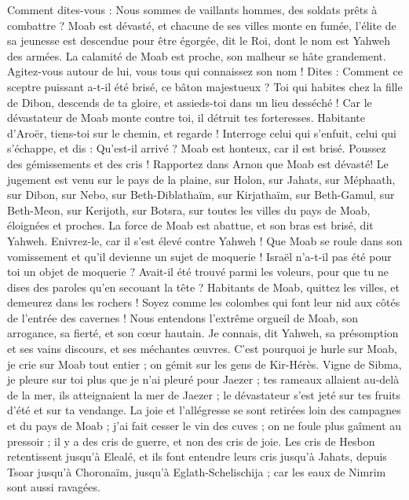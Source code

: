 \begin{multicols}{2}
Comment dites-vous : Nous sommes de vaillants hommes, des soldats prêts à combattre ?
Moab est dévasté, et chacune de ses villes monte en fumée, l'élite de sa jeunesse est descendue pour être égorgée, dit le Roi, dont le nom est Yahweh des armées.
La calamité de Moab est proche, son malheur se hâte grandement.
Agitez-vous autour de lui, vous tous qui connaissez son nom ! Dites : Comment ce sceptre puissant a-t-il été brisé, ce bâton majestueux ?
Toi qui habites chez la fille de Dibon, descends de ta gloire, et assieds-toi dans un lieu desséché ! Car le dévastateur de Moab monte contre toi, il détruit tes forteresses.
Habitante d'Aroër, tiens-toi sur le chemin, et regarde ! Interroge celui qui s'enfuit, celui qui s'échappe, et dis : Qu'est-il arrivé ?
Moab est honteux, car il est brisé. Poussez des gémissements et des cris ! Rapportez dans Arnon que Moab est dévasté!
Le jugement est venu sur le pays de la plaine, sur Holon, sur Jahats, sur Méphaath,
sur Dibon, sur Nebo, sur Beth-Diblathaïm,
sur Kirjathaïm, sur Beth-Gamul, sur Beth-Meon,
sur Kerijoth, sur Botsra, sur toutes les villes du pays de Moab, éloignées et proches.
La force de Moab est abattue, et son bras est brisé, dit Yahweh.
Enivrez-le, car il s'est élevé contre Yahweh ! Que Moab se roule dans son vomissement et qu'il devienne un sujet de moquerie !
Israël n'a-t-il pas été pour toi un objet de moquerie ? Avait-il été trouvé parmi les voleurs, pour que tu ne dises des paroles qu'en secouant la tête ?
Habitants de Moab, quittez les villes, et demeurez dans les rochers ! Soyez comme les colombes qui font leur nid aux côtés de l'entrée des cavernes !
Nous entendons l'extrême orgueil de Moab, son arrogance, sa fierté, et son cœur hautain.
Je connais, dit Yahweh, sa présomption et ses vains discours, et ses méchantes œuvres.
C’est pourquoi je hurle sur Moab, je crie sur Moab tout entier ; on gémit sur les gens de Kir-Hérès.
Vigne de Sibma, je pleure sur toi plus que je n'ai pleuré pour Jaezer ; tes rameaux allaient au-delà de la mer, ils atteignaient la mer de Jaezer ; le dévastateur s'est jeté sur tes fruits d'été et sur ta vendange.
La joie et l'allégresse se sont retirées loin des campagnes et du pays de Moab ; j'ai fait cesser le vin des cuves ; on ne foule plus gaîment au pressoir ; il y a des cris de guerre, et non des cris de joie.
Les cris de Hesbon retentissent jusqu’à Elealé, et ils font entendre leurs cris jusqu’à Jahats, depuis Tsoar jusqu'à Choronaïm, jusqu'à Eglath-Schelischija ; car les eaux de Nimrim sont aussi ravagées.

\end{multicols}
